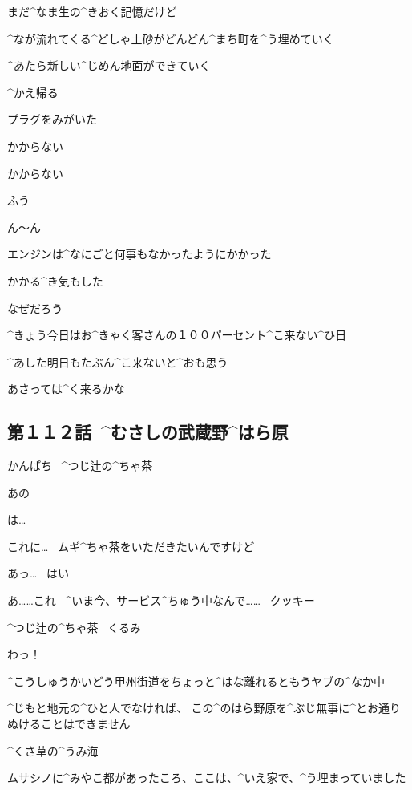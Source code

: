 \Alpha まだ^{なま}{生}の^{きおく}{記憶}だけど

\Alpha ^{なが}{流}れてくる^{どしゃ}{土砂}がどんどん^{まち}{町}を^{う}{埋}めていく

\Alpha ^{あたら}{新}しい^{じめん}{地面}ができていく

\page
\Alpha ^{かえ}{帰}る

\page
\Alpha プラグをみがいた

\Alpha かからない

\Alpha かからない

\Alpha ふう

\page
\Alpha ん〜ん

\page[16]
\Alpha エンジンは^{なにごと}{何事}もなかったようにかかった

\Alpha かかる^{き}{気}もした

\Alpha なぜだろう

\page
\Alpha ^{きょう}{今日}はお^{きゃく}{客}さんの１００パーセント^{こ}{来}ない^{ひ}{日}

\page
\Alpha ^{あした}{明日}もたぶん^{こ}{来}ないと^{おも}{思}う

\Alpha あさっては^{く}{来}るかな


\subsection{第１１２話\ ^{むさしの}{武蔵野}^{はら}{原}}

\page[22]
\Sign かんぱち
\ ^{つじ}{辻}の^{ちゃ}{茶}

\Kokone あの

\Person は…

\Kokone これに…
\ ムギ^{ちゃ}{茶}をいただきたいんですけど

\Person あっ…
\ はい

\page
\Person あ……これ
\ ^{いま}{今}、サービス^{ちゅう}{中}なんで……
\ クッキー

\Sign ^{つじ}{辻}の^{ちゃ}{茶}
\ くるみ

\Kokone わっ！

\page
\Kokone ^{こうしゅうかいどう}{甲州街道}をちょっと^{はな}{離}れるともうヤブの^{なか}{中}

\Kokone ^{じもと}{地元}の^{ひと}{人}でなければ、
この^{のはら}{野原}を^{ぶじ}{無事}に^{とお}{通}りぬけることはできません

\page
\Kokone ^{くさ}{草}の^{うみ}{海}

\Kokone ムサシノに^{みやこ}{都}があったころ、ここは、^{いえ}{家}で、^{う}{埋}まっていました

